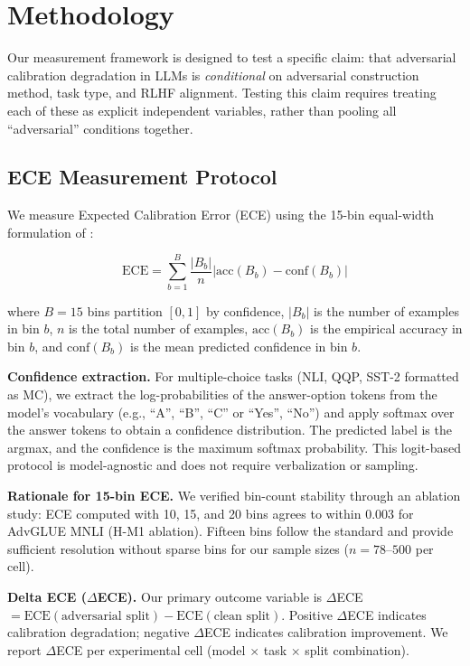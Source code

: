 \section{Methodology}
\label{sec:methodology}

Our measurement framework is designed to test a specific claim: that adversarial calibration degradation in LLMs is \textit{conditional} on adversarial construction method, task type, and RLHF alignment. Testing this claim requires treating each of these as explicit independent variables, rather than pooling all ``adversarial'' conditions together.

\subsection{ECE Measurement Protocol}

We measure Expected Calibration Error (ECE) using the 15-bin equal-width formulation of \citet{guo2017calibration}:

\begin{equation}
\text{ECE} = \sum_{b=1}^{B} \frac{|B_b|}{n} \left| \text{acc}(B_b) - \text{conf}(B_b) \right|
\end{equation}

where $B = 15$ bins partition $[0, 1]$ by confidence, $|B_b|$ is the number of examples in bin $b$, $n$ is the total number of examples, $\text{acc}(B_b)$ is the empirical accuracy in bin $b$, and $\text{conf}(B_b)$ is the mean predicted confidence in bin $b$.

\textbf{Confidence extraction.} For multiple-choice tasks (NLI, QQP, SST-2 formatted as MC), we extract the log-probabilities of the answer-option tokens from the model's vocabulary (e.g., ``A'', ``B'', ``C'' or ``Yes'', ``No'') and apply softmax over the answer tokens to obtain a confidence distribution. The predicted label is the argmax, and the confidence is the maximum softmax probability. This logit-based protocol is model-agnostic and does not require verbalization or sampling.

\textbf{Rationale for 15-bin ECE.} We verified bin-count stability through an ablation study: ECE computed with 10, 15, and 20 bins agrees to within 0.003 for AdvGLUE MNLI (H-M1 ablation). Fifteen bins follow the \citet{guo2017calibration} standard and provide sufficient resolution without sparse bins for our sample sizes ($n = 78$--$500$ per cell).

\textbf{Delta ECE ($\Delta$ECE).} Our primary outcome variable is $\Delta$ECE $= \text{ECE}(\text{adversarial split}) - \text{ECE}(\text{clean split})$. Positive $\Delta$ECE indicates calibration degradation; negative $\Delta$ECE indicates calibration improvement. We report $\Delta$ECE per experimental cell (model $\times$ task $\times$ split combination).

